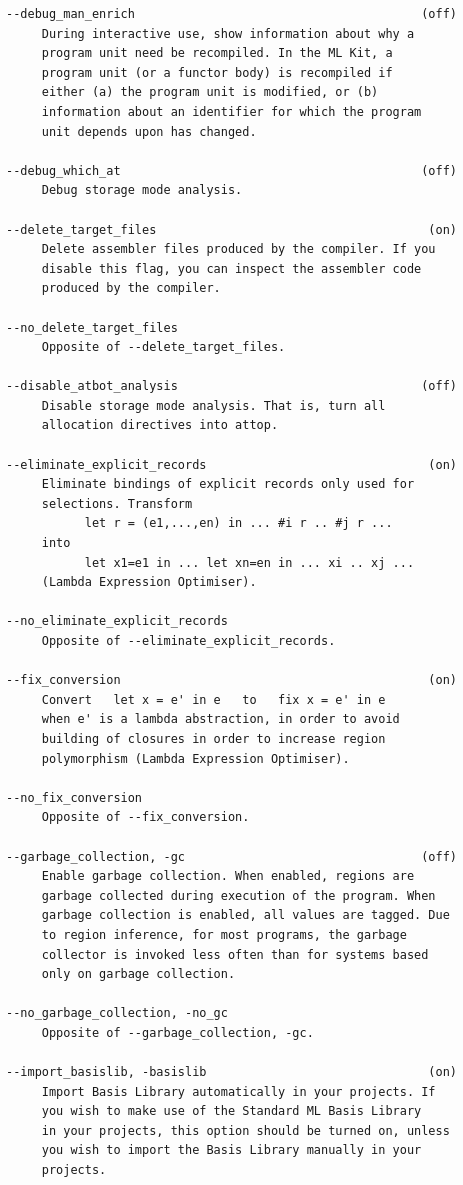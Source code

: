 \documentclass[12pt]{book}
\begin{document}
\begin{verbatim}
--debug_man_enrich                                        (off)
     During interactive use, show information about why a
     program unit need be recompiled. In the ML Kit, a
     program unit (or a functor body) is recompiled if
     either (a) the program unit is modified, or (b)
     information about an identifier for which the program
     unit depends upon has changed.

--debug_which_at                                          (off)
     Debug storage mode analysis.

--delete_target_files                                      (on)
     Delete assembler files produced by the compiler. If you
     disable this flag, you can inspect the assembler code
     produced by the compiler.

--no_delete_target_files
     Opposite of --delete_target_files.

--disable_atbot_analysis                                  (off)
     Disable storage mode analysis. That is, turn all
     allocation directives into attop.

--eliminate_explicit_records                               (on)
     Eliminate bindings of explicit records only used for
     selections. Transform
           let r = (e1,...,en) in ... #i r .. #j r ...
     into
           let x1=e1 in ... let xn=en in ... xi .. xj ...
     (Lambda Expression Optimiser).

--no_eliminate_explicit_records
     Opposite of --eliminate_explicit_records.

--fix_conversion                                           (on)
     Convert   let x = e' in e   to   fix x = e' in e
     when e' is a lambda abstraction, in order to avoid
     building of closures in order to increase region
     polymorphism (Lambda Expression Optimiser).

--no_fix_conversion
     Opposite of --fix_conversion.

--garbage_collection, -gc                                 (off)
     Enable garbage collection. When enabled, regions are
     garbage collected during execution of the program. When
     garbage collection is enabled, all values are tagged. Due
     to region inference, for most programs, the garbage
     collector is invoked less often than for systems based
     only on garbage collection.

--no_garbage_collection, -no_gc
     Opposite of --garbage_collection, -gc.

--import_basislib, -basislib                               (on)
     Import Basis Library automatically in your projects. If 
     you wish to make use of the Standard ML Basis Library
     in your projects, this option should be turned on, unless
     you wish to import the Basis Library manually in your
     projects.


\end{verbatim}
\end{document}
